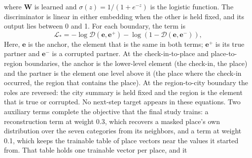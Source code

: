 where $\mathbf{W}$ is learned and
$\sigma(z)=1/(1+e^{-z})$ is the logistic function. The discriminator is linear in
either embedding when the other is held fixed, and its output lies between 0 and 1.
For each boundary, the term is
\begin{equation}\label{eq:fund:check2hgi-term}
    \mathcal{L}_{*} = -\log \mathcal{D}(\mathbf{e}, \mathbf{e}^{+})
    - \log\left(1 - \mathcal{D}(\mathbf{e}, \mathbf{e}^{-})\right),
\end{equation}
Here, $\mathbf{e}$ is the anchor, the element that is the same in both terms;
$\mathbf{e}^{+}$ is its true partner and $\mathbf{e}^{-}$ is a corrupted partner. At the check-in-to-place and
place-to-region boundaries, the anchor is the lower-level element (the check-in, the
place) and the partner is the element one level above it (the place where the check-in
occurred, the region that contains the place). At the region-to-city boundary the roles
are reversed: the city summary is held fixed and the region is the element that is true
or corrupted. No next-step target appears in these equations. Two auxiliary terms complete the
objective that the final study trains: a reconstruction term at weight 0.3, which
recovers a masked place's own distribution over the seven categories from its
neighbors, and a term at weight 0.1, which keeps the trainable table of place vectors
near the values it started from. That table holds one trainable vector per place, and it
